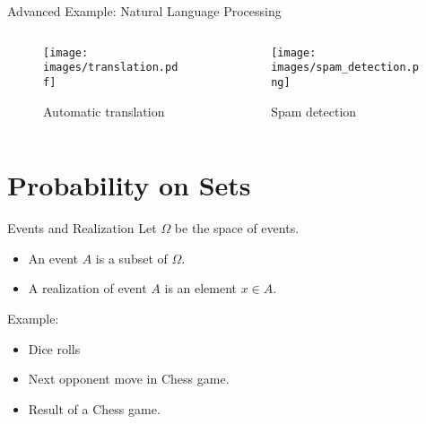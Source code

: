 \documentclass{beamer}
\newcommand{\1}{\mathbf{1}}
\begin{document}
\begin{frame}{Advanced Example: Natural Language Processing}
  \begin{columns}

    \begin{column}{0.5\textwidth}
      \begin{figure}
        \centering
        \texttt{[image: images/translation.pdf]} %
        \caption{Automatic translation}
      \end{figure}
    \end{column}

    \begin{column}{0.5\textwidth}
      \begin{figure}
        \centering
        \texttt{[image: images/spam\_detection.png]}
        \caption{Spam detection}
      \end{figure}
    \end{column}

  \end{columns}
\end{frame}

\section{Probability on Sets}

\begin{frame}{Events and Realization}
  Let $\Omega$ be the space of events.\\
  \begin{itemize}
    \item An event $A$ is a subset of $\Omega$.
    \item A realization of event $A$ is an element $x \in A$.
  \end{itemize}
  \vspace{0.5cm}
  Example:
  \begin{itemize}
    \item Dice rolls
    \item Next opponent move in Chess game.
    \item Result of a Chess game.
  \end{itemize}
\end{frame}
\end{document}
